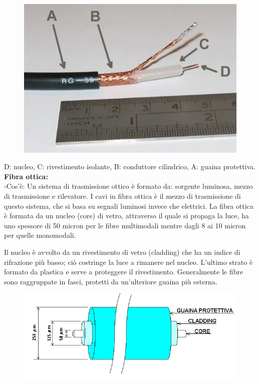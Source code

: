 \begin{figure}[H]
\centering
\includegraphics[scale=1]{res/img/3_cavoCoassiale.jpg}
\end{figure}
D: nucleo, C: rivestimento isolante, B: conduttore cilindrico, A: guaina protettiva. \\
\textbf{Fibra ottica:}\\
-Cos’è: Un sistema di trasmissione ottico è formato da: sorgente luminosa, mezzo di trasmissione e rilevatore. I cavi in fibra ottica è il mezzo di trasmissione di questo sistema, che si basa su segnali luminosi invece che elettrici.
La fibra ottica è formata da un nucleo (core) di vetro, attraverso il quale si propaga la luce, ha uno spessore di 50 micron per le fibre multimodali mentre dagli 8 ai 10 micron per quelle monomodali.

Il nucleo è avvolto da un rivestimento di vetro (cladding) che ha un indice di rifrazione più basso; ciò costringe la luce a rimanere nel nucleo. L’ultimo strato è formato da plastica e serve a proteggere il rivestimento. Generalmente le fibre sono raggruppate in fasci, protetti da un’ulteriore guaina più esterna.  

\begin{figure}[H]
\centering
\includegraphics[scale=0.7]{res/img/3_FibraOttica.png}
\end{figure}

